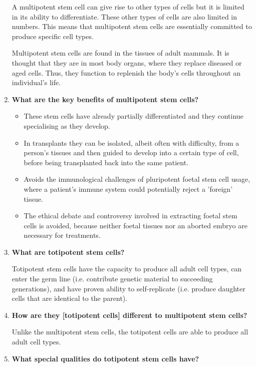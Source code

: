 \documentclass[a4paper]{article}
\begin{document}
\begin{enumerate}
A multipotent stem cell can give rise to other types of cells but it is limited in its ability to differentiate. These other types of cells are also limited in numbers. This means that multipotent stem cells are essentially committed to produce specific cell types.

Multipotent stem cells are found in the tissues of adult mammals. It is thought that they are in most body organs, where they replace diseased or aged cells. Thus, they function to replenish the body's cells throughout an individual's life.
    \item \textbf{What are the key benefits of multipotent stem cells? \cite{noauthor_multipotent_nodate}}
    
\begin{itemize}
    \item These stem cells have already partially differentiated and they continue specialising as they develop.
    \item In transplants they can be isolated, albeit often with difficulty, from a person's tissues and then guided to develop into a certain type of cell, before being transplanted back into the same patient.
    \item Avoids the immunological challenges of pluripotent foetal stem cell usage, where a patient's immune system could potentially reject a 'foreign' tissue. 
    \item The ethical debate and controversy involved in extracting foetal stem cells is avoided, because neither foetal tissues nor an aborted embryo are necessary for treatments.
\end{itemize}

    \item \textbf{What are totipotent stem cells? \cite{noauthor_totipotent_nodate}}

Totipotent stem cells have the capacity to produce all adult cell types, can enter the germ line (i.e. contribute genetic material to succeeding generations), and have proven ability to self-replicate (i.e. produce daughter cells that are identical to the parent).


    \item \textbf{How are they [totipotent cells] different to multipotent stem cells? \cite{noauthor_totipotent_nodate} }

Unlike the multipotent stem cells, the totipotent cells are able to produce all adult cell types. 

    \item \textbf{What special qualities do totipotent stem cells have?} \cite{noauthor_totipotent_nodate}


\end{enumerate}
\end{document}
